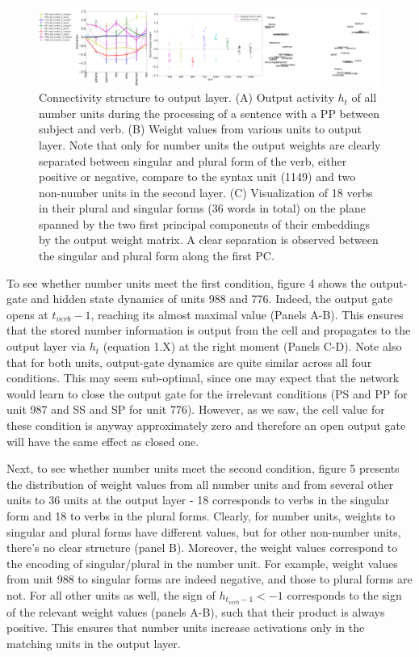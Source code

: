 \begin{figure}[t]
\centering
\includegraphics[width=\textwidth]{Figures/Figure4_output_weights.png}
\caption{Connectivity structure to output layer. (A) Output activity $h_t$ of all number units during the processing of a sentence with a PP between subject and verb. (B) Weight values from various units to output layer. Note that only for number units the output weights are clearly separated between singular and plural form of the verb, either positive or negative, compare to the syntax unit (1149) and two non-number units in the second layer. (C) Visualization of 18 verbs in their plural and singular forms (36 words in total) on the plane spanned by the two first principal components of their embeddings by the output weight matrix. A clear separation is observed between the singular and plural form along the first PC.}
\end{figure}

To see whether number units meet the first condition, figure 4 shows the output-gate and hidden state dynamics of units 988 and 776. Indeed, the output gate opens at $t_{verb}-1$, reaching its almost maximal value (Panels A-B). This ensures that the stored number information is output from the cell and propagates to the output layer via $h_t$ (equation 1.X) at the right moment (Panels C-D). Note also that for both units, output-gate dynamics are quite similar across all four conditions. This may seem sub-optimal, since one may expect that the network would learn to close the output gate for the irrelevant conditions (PS and PP for unit 987 and SS and SP for unit 776). However, as we saw, the cell value for these condition is anyway approximately zero and therefore an open output gate will have the same effect as closed one.

Next, to see whether number units meet the second condition, figure 5 presents the distribution of weight values from all number units and from several other units to 36 units at the output layer - 18 corresponds to verbs in the singular form and 18 to verbs in the plural forms. Clearly, for number units, weights to singular and plural forms have different values, but for other non-number units, there's no clear structure (panel B). Moreover, the weight values correspond to the encoding of singular/plural in the number unit. For example, weight values from unit 988 to singular forms are indeed negative, and those to plural forms are not. For all other units as well, the sign of $h_{t_{verb}-1}<-1$ corresponds to the sign of the relevant weight values (panels A-B), such that their product is always positive. This ensures that number units increase activations only in the matching units in the output layer.
